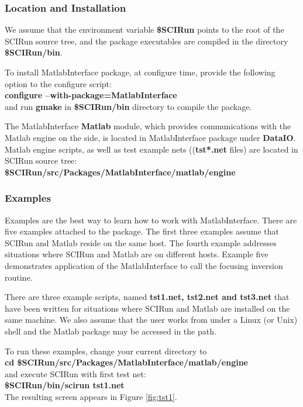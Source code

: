 \subsubsection{Location and Installation} \indent

We assume that the environment variable {\bf \$SCIRun} points to the root
of the SCIRun source tree, and the package executables are compiled in the
directory {\bf \$SCIRun/bin}.

To install MatlabInterface package, at configure time, provide the
following option to the configure script: \\
{\bf configure --with-package=MatlabInterface} \\
and run {\bf gmake } in {\bf \$SCIRun/bin} directory
to compile the package. 

The MatlabInterface {\bf Matlab} module, which provides communications with 
the Matlab engine on the \sr{} side, is located in MatlabInterface 
package under {\bf DataIO}. Matlab engine scripts, as well as test 
example nets (({\bf tst*.net} files) are located in SCIRun source tree: \\
{\bf \$SCIRun/src/Packages/MatlabInterface/matlab/engine }\\

\subsubsection{Examples} \indent

Examples are the best way to learn how to work with MatlabInterface.
There are five examples attached to the package. The first three
examples assume that SCIRun and Matlab reside on the same host.
The fourth example addresses situations where SCIRun and Matlab are
on different hosts. Example five demonstrates
application of the MatlabInterface to call the focusing inversion routine.

There are three example scripts, named {\bf tst1.net, tst2.net and tst3.net}
that have been written for situations where SCIRun and 
Matlab are installed on the same machine. 
We also assume that the user works from under a Linux (or Unix)
shell and the Matlab package may be accessed in the path. 

To run these examples, change your current directory to \\
{\bf cd \$SCIRun/src/Packages/MatlabInterface/matlab/engine } \\
and execute SCIRun with first test net: \\
{\bf \$SCIRun/bin/scirun  tst1.net} \\
The resulting screen appears in Figure \ref{fig:tst1}.

